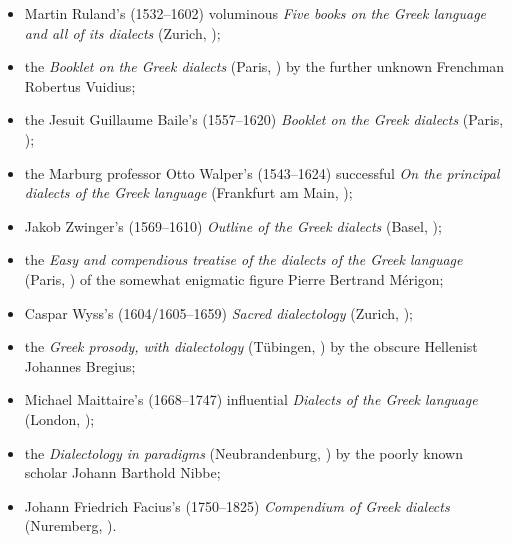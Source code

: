 {\sloppy\begin{itemize}
\item 
Martin Ruland’s (1532–1602) voluminous \textit{Five books on the Greek language and all of its dialects} (Zurich, \citeyear{Ruland1556});

\item 
the \textit{Booklet on the Greek dialects} (Paris, \citeyear{Vuidius1569}) by the further unknown Frenchman Robertus Vuidius;

\item 
the  Jesuit Guillaume Baile’s (1557–1620) \textit{Booklet on the Greek dialects} (Paris, \citeyear{Baile1588});

\item 
the Marburg professor Otto Walper’s (1543–1624) successful \textit{On the principal dialects of the Greek language} (Frankfurt am Main, \citeyear{Walper1589});

\item 
Jakob Zwinger’s (1569–1610) \textit{Outline of the Greek dialects} (Basel, \citeyear{Zwinger1605});

\item 
the \textit{Easy and compendious treatise of the dialects of the Greek language} (Paris, \citeyear{Merigon1621}) of the somewhat enigmatic figure Pierre Bertrand Mérigon;

\item 
Caspar Wyss’s (1604/1605–1659) \textit{Sacred dialectology} (Zurich, \citeyear{Wyss1650});

\item 
the \textit{Greek prosody, with dialectology} (Tübingen, \citeyear{Bregius1684}) by the obscure Hellenist Johannes Bregius;

\item 
Michael Maittaire’s (1668–1747) influential \textit{Dialects of the Greek language} (London, \citeyear{Maittaire1706});

\item 
the \textit{Dialectology in paradigms} (Neubrandenburg, \citeyear{Nibbe1755}) by the poorly known scholar Johann Barthold Nibbe;

\item 
Johann Friedrich Facius’s (1750–1825) \textit{Compendium of Greek dialects} (Nuremberg, \citeyear{Facius1782}).
\end{itemize}}

